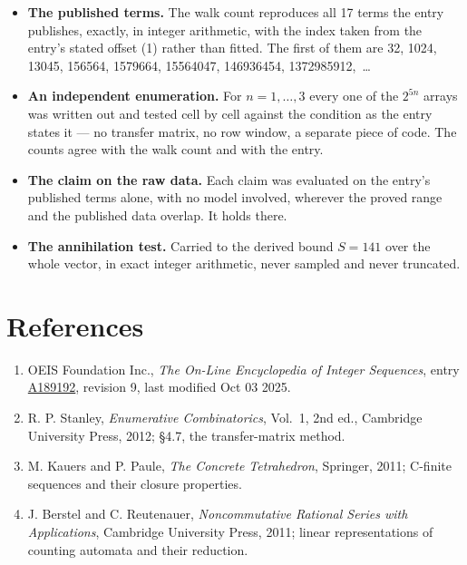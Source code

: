 \documentclass[11pt]{article}
\theoremstyle{definition}
\begin{document}
\begin{itemize}

\item {\bfseries The published terms.} The walk count reproduces all 17 terms the entry publishes, exactly, in integer arithmetic, with the index taken from the entry's stated offset (1) rather than fitted. The first of them are 32, 1024, 13045, 156564, 1579664, 15564047, 146936454, 1372985912,~\dots

\item {\bfseries An independent enumeration.} For $n = 1,\dots,3$ every one of the $2^{5n}$ arrays was written out and tested cell by cell against the condition as the entry states it --- no transfer matrix, no row window, a separate piece of code. The counts agree with the walk count and with the entry.

\item {\bfseries The claim on the raw data.} Each claim was evaluated on the entry's published terms alone, with no model involved, wherever the proved range and the published data overlap. It holds there.

\item {\bfseries The annihilation test.} Carried to the derived bound $S = 141$ over the whole vector, in exact integer arithmetic, never sampled and never truncated.

\end{itemize}

\section{References}

\begin{enumerate}

\item OEIS Foundation Inc., \emph{The On-Line Encyclopedia of Integer Sequences}, entry \href{https://oeis.org/A189192}{A189192}, revision 9, last modified Oct 03 2025.

\item R. P. Stanley, \emph{Enumerative Combinatorics}, Vol.~1, 2nd ed., Cambridge University Press, 2012; \S4.7, the transfer-matrix method.

\item M. Kauers and P. Paule, \emph{The Concrete Tetrahedron}, Springer, 2011; C-finite sequences and their closure properties.

\item J. Berstel and C. Reutenauer, \emph{Noncommutative Rational Series with Applications}, Cambridge University Press, 2011; linear representations of counting automata and their reduction.

\end{enumerate}
\end{document}
